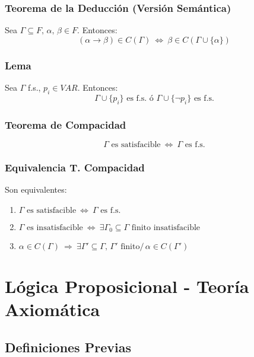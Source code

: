\documentclass{article}
\newcommand{\comma}{,\,}                                %
\newcommand{\tq}{/\,}                                   %
\newcommand{\Rightarrows}{\: \Rightarrow \:}            %
\newcommand{\Leftrightarrows}{\: \Leftrightarrow \:}    %
\begin{document}
\subsubsection{Teorema de la Deducción (Versión Semántica)}
Sea $\Gamma \subseteq F \comma \alpha \comma \beta \in F$. Entonces:
\begin{equation*}
    (\alpha \rightarrow \beta) \in C(\Gamma) \Leftrightarrows \beta \in C(\Gamma \cup \{\alpha\})
\end{equation*}

\subsubsection{Lema}
Sea $\Gamma$ f.s., $p_i \in VAR$. Entonces: 
\begin{equation*}
    \Gamma \cup \{p_i\} \text{ es f.s. ó } \Gamma \cup \{\neg p_i\} \text{ es f.s.} 
\end{equation*}

\subsubsection{Teorema de Compacidad}
\begin{equation*}
    \Gamma \text{ es satisfacible} \Leftrightarrows \Gamma \text{ es f.s.}
\end{equation*}

\subsubsection{Equivalencia T. Compacidad}
Son equivalentes:
\begin{enumerate}
    \item $\Gamma \text{ es satisfacible} \Leftrightarrows \Gamma \text{ es f.s.}$
    \item $\Gamma \text{ es insatisfacible} \Leftrightarrows \exists \Gamma_0 \subseteq \Gamma \text{ finito insatisfacible}$
    \item $\alpha \in C(\Gamma) \Rightarrows \exists \Gamma' \subseteq \Gamma \comma \Gamma' \text{ finito} \tq \alpha \in C(\Gamma')$
\end{enumerate}


\newpage
\section{Lógica Proposicional - Teoría Axiomática}
\subsection{Definiciones Previas}
\end{document}
